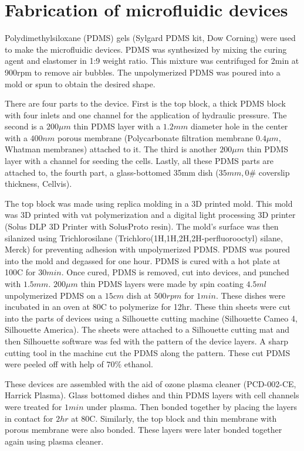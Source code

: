 \section{Fabrication of microfluidic devices}
 
Polydimethylsiloxane (PDMS) gels (Sylgard PDMS kit, Dow Corning) were used to make the microfluidic devices. PDMS was synthesized by mixing the curing agent and elastomer in 1:9 weight ratio. This mixture was centrifuged for 2min at 900rpm to remove air bubbles. The unpolymerized PDMS was poured into a mold or spun to obtain the desired shape. 

There are four parts to the device. First is the top block, a thick PDMS block with four inlets and one channel for the application of hydraulic pressure. The second is a $200 \mu m$ thin PDMS layer with a $1.2mm$ diameter hole in the center with a $400nm$ porous membrane (Polycarbonate filtration membrane $0.4\mu m$, Whatman membranes) attached to it. The third is another $200 \mu m$ thin PDMS layer with a channel for seeding the cells. Lastly, all these PDMS parts are attached to, the fourth part, a glass-bottomed 35mm dish ($35mm, 0\#$ coverslip thickness, Cellvis). 

The top block was made using replica molding in a 3D printed mold. This mold was 3D printed with vat polymerization and a digital light processing 3D printer (Solus DLP 3D Printer with SolusProto resin). The mold’s surface was then silanized using Trichlorosilane (Trichloro(1H,1H,2H,2H-perfluorooctyl) silane, Merck) for preventing adhesion with unpolymerized PDMS. PDMS was poured into the mold and degassed for one hour. PDMS is cured with a hot plate at 100\textdegree{}C for $30min$. Once cured, PDMS is removed, cut into devices, and punched with $1.5mm$. $200\mu m$ thin PDMS layers were made by spin coating $4.5ml$ unpolymerized PDMS on a $15cm$ dish at $500rpm$ for $1min$. These dishes were incubated in an oven at 80\textdegree{}C to polymerize for 12hr. These thin sheets were cut into the parts of devices using a Silhouette cutting machine (Silhouette Cameo 4, Silhouette America). The sheets were attached to a Silhouette cutting mat and then Silhouette software was fed with the pattern of the device layers. A sharp cutting tool in the machine cut the PDMS along the pattern. These cut PDMS were peeled off with help of $70\%$ ethanol. 

These devices are assembled with the aid of ozone plasma cleaner (PCD-002-CE, Harrick Plasma). Glass bottomed dishes and thin PDMS layers with cell channels were treated for $1 min$ under plasma. Then bonded together by placing the layers in contact for $2 hr$ at 80\textdegree{}C. Similarly, the top block and thin membrane with porous membrane were also bonded. These layers were later bonded together again using plasma cleaner.

